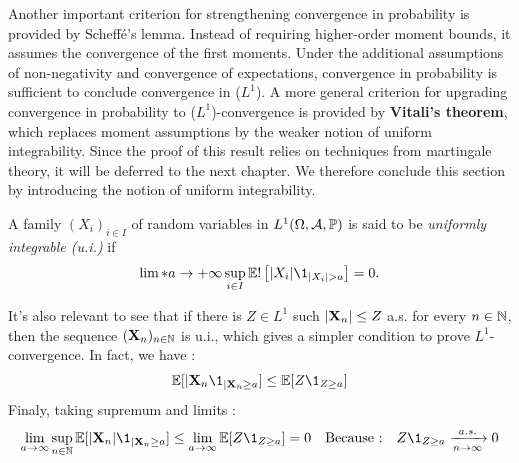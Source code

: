 \documentclass[../Main.tex]{subfiles}
\begin{document}
Another important criterion for strengthening convergence in probability is provided by Scheffé's lemma. Instead of requiring higher-order moment bounds, it assumes the convergence of the first moments. Under the additional assumptions of non-negativity and convergence of expectations, convergence in probability is sufficient to conclude convergence in ($L^1$).
A more general criterion for upgrading convergence in probability to ($L^1$)-convergence is provided by \textbf{Vitali's theorem}, which replaces moment assumptions by the weaker notion of uniform integrability. Since the proof of this result relies on techniques from martingale theory, it will be deferred to the next chapter. We therefore conclude this section by introducing the notion of uniform integrability.

A family $(X_i)_{i\in I}$ of random variables in $L^1(\Omega,\mathcal{A},\mathbb{P})$ is said to be \textit{uniformly integrable (u.i.)} if
\[ \lim*{a\to+\infty} \sup_{i\in I} \EE!\left[|X_i|\1_{{|X_i|>a}}\right] =0. \]

It's also relevant to see that if there is $Z\in L^1$ such $|\mathbf{X}_n| \leq Z$ a.s. for every $n\in\mathbb{N}$, then the sequence $(\mathbf{X}_n)_{n \in \mathbb{N}}$ is u.i., which gives a simpler condition to prove $L^1$-convergence. In fact, we have :
\[ \EE[|\bX_n \1_{|\bX_n\geq a}] \leq \EE[Z\1_{Z\geq a}]  \]
Finaly, taking supremum and limits : 
\[ \lim_{\goto{a}} \sup_{n\in\NN} \EE[|\bX_n| \1_{|\bX_n\geq a}] \leq \lim_{\goto{a}} \EE[Z\1_{Z\geq a}] = 0 \quad \text{Because :}\quad Z\1_{Z\geq a} \conv[a.s.]{n} 0\]
\end{document}
